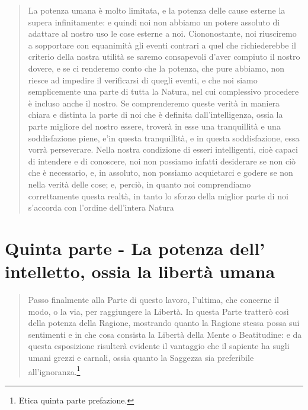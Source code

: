 \begin{quotation}
	\small La potenza umana è molto limitata, e la potenza delle cause esterne la supera infinitamente: e quindi noi non abbiamo un potere assoluto di adattare al nostro uso le cose esterne a noi. Ciononostante, noi riusciremo a sopportare con equanimità gli eventi contrari a
	quel che richiederebbe il criterio della nostra utilità se saremo consapevoli d’aver compiuto
	il nostro dovere, e se ci renderemo conto che la potenza, che pure abbiamo, non riesce ad
	impedire il verificarsi di quegli eventi, e che noi siamo semplicemente una parte di tutta la
	Natura, nel cui complessivo procedere è incluso anche il nostro. Se comprenderemo queste
	verità in maniera chiara e distinta la parte di noi che è definita dall’intelligenza, ossia la
	parte migliore del nostro essere, troverà in esse una tranquillità e una soddisfazione piene,
	e’in questa tranquillità, e in questa soddisfazione, essa vorrà perseverare. Nella nostra condizione di esseri intelligenti, cioè capaci di intendere e di conoscere, noi non possiamo infatti desiderare se non ciò che è necessario, e, in assoluto, non possiamo acquietarci e godere se non nella verità delle cose; e, perciò, in quanto noi comprendiamo correttamente
	questa realtà, in tanto lo sforzo della miglior parte di noi s’accorda con l’ordine dell’intera
	Natura
\end{quotation}
\newpage

\section[La libertà umana]{Quinta parte - La potenza dell'\\intelletto, ossia la libertà umana}
\bigskip
\begin{quotation}
	\small Passo finalmente alla Parte di questo lavoro, l’ultima, che concerne il modo, o la via, per
	raggiungere la Libertà. In questa Parte tratterò così della potenza della Ragione, mostrando quanto la Ragione stessa possa sui sentimenti e in che cosa consista la Libertà della
	Mente o Beatitudine: e da questa esposizione risulterà evidente il vantaggio che il sapiente
	ha sugli umani grezzi e carnali, ossia quanto la Saggezza sia preferibile all’ignoranza.\footnote{Etica quinta parte prefazione.}
\end{quotation}

